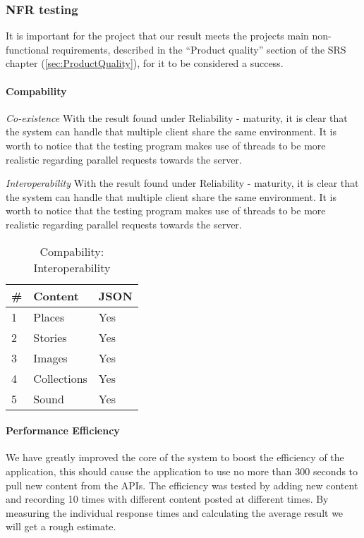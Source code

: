 \subsubsection{NFR testing}
It is important for the project that our result meets the projects main non-functional requirements, described in the ``Product quality'' section of the SRS chapter (\ref{sec:ProductQuality}), for it to be considered a success. 

\paragraph{Compability}

\emph{Co-existence}
With the result found under Reliability - maturity, it is clear that the system can handle  that multiple client share the same environment. It is worth to notice that the testing program makes use of threads to be more realistic regarding parallel requests towards the server.

\emph{Interoperability}
With the result found under Reliability - maturity, it is clear that the system can handle  that multiple client share the same environment. It is worth to notice that the testing program makes use of threads to be more realistic regarding parallel requests towards the server.

\begin{table}[!htp]
\begin{center}
	\begin{tabular}{ | l | l | l | }
	\hline
	 \#	 	& Content 		& JSON 	\\ \hline
	 1		&Places		& Yes	\\ \hline
	 2		&Stories		& Yes	\\ \hline
	 3		&Images		& Yes	\\ \hline
	 4		&Collections	& Yes	\\ \hline
	 5		&Sound		& Yes 	\\
	 \hline
 	 \end{tabular}
\end{center}
\caption{Compability: Interoperability}
\label{tab:Compability: Interoperability}
\end{table}

\paragraph{Performance Efficiency}
We have greatly improved the core of the system to boost the efficiency of the application, this should cause the application to use no more than 300 seconds to pull new content from the APIs. The efficiency was tested by adding new content and recording 10 times with different content posted at different times. By measuring the individual response times and calculating the average result we will get a rough estimate.\\

